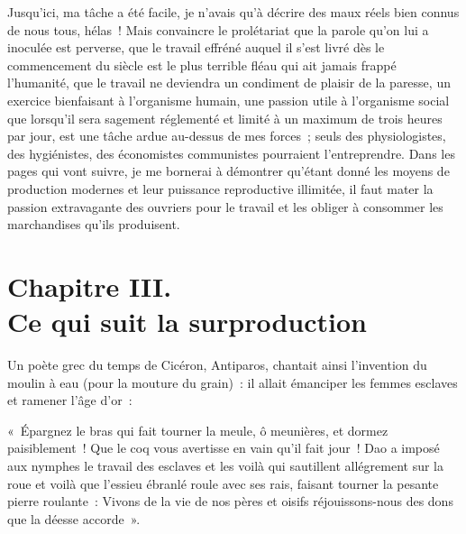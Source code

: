 \documentclass[french,twoside]{book} %
\newenvironment{quoteblock}%
  {\begin{quoting}}
  {\end{quoting}}
\newcommand\chapteropen{} %
\newcommand\chaptercont{} %
\newcommand\chapterclose{} %
\newenvironment{quotebar}{%
    \def\FrameCommand{{\color{rubric!10!}\vrule width 0.5em} \hspace{0.9em}}%
    \def\OuterFrameSep{\itemsep} %
    \MakeFramed {\advance\hsize-\width \FrameRestore}
  }%
  {%
    \endMakeFramed
  }
\renewenvironment{quoteblock}%
  {%
    \savenotes
    \setstretch{0.9}
    \normalfont
    \begin{quotebar}
  }
  {%
    \end{quotebar}
    \spewnotes
  }
\begin{document}
Jusqu’ici, ma tâche a été facile, je n’avais qu’à décrire des maux réels bien connus de nous tous, hélas ! Mais convaincre le prolétariat que la parole qu’on lui a inoculée est perverse, que le travail effréné auquel il s’est livré dès le commencement du siècle est le plus terrible fléau qui ait jamais frappé l’humanité, que le travail ne deviendra un condiment de plaisir de la paresse, un exercice bienfaisant à l’organisme humain, une passion utile à l’organisme social que lorsqu’il sera sagement réglementé et limité à un maximum de trois heures par jour, est une tâche ardue au-dessus de mes forces ; seuls des physiologistes, des hygiénistes, des économistes communistes pourraient l’entreprendre. Dans les pages qui vont suivre, je me bornerai à démontrer qu’étant donné les moyens de production modernes et leur puissance reproductive illimitée, il faut mater la passion extravagante des ouvriers pour le travail et les obliger à consommer les marchandises qu’ils produisent.
\chapterclose


\chapteropen
\chapter[Chapitre III. Ce qui suit la surproduction]{Chapitre III. \\
Ce qui suit la surproduction}\renewcommand{\leftmark}{Chapitre III. \\
Ce qui suit la surproduction}


\chaptercont
\noindent Un poète grec du temps de Cicéron, Antiparos, chantait ainsi l’invention du moulin à eau (pour la mouture du grain) : il allait émanciper les femmes esclaves et ramener l’âge d’or :\par

\begin{quoteblock}
 \noindent « Épargnez le bras qui fait tourner la meule, ô meunières, et dormez paisiblement ! Que le coq vous avertisse en vain qu’il fait jour ! Dao a imposé aux nymphes le travail des esclaves et les voilà qui sautillent allégrement sur la roue et voilà que l’essieu ébranlé roule avec ses rais, faisant tourner la pesante pierre roulante : Vivons de la vie de nos pères et oisifs réjouissons-nous des dons que la déesse accorde ».
\end{quoteblock}
\end{document}
